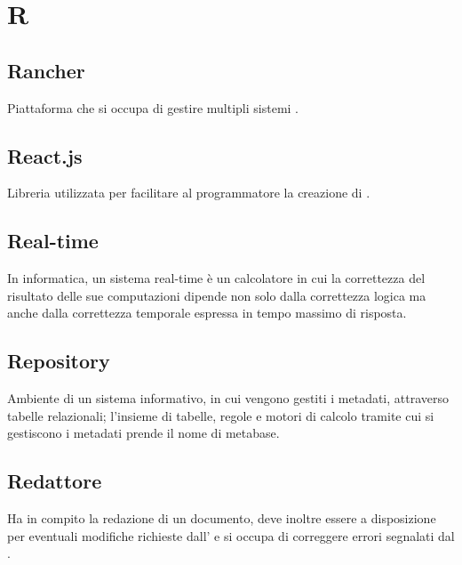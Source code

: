 \section*{R}
\markright{}

\subsection*{Rancher}
Piattaforma che si occupa di gestire multipli sistemi .

\subsection*{React.js}
Libreria  utilizzata per facilitare al programmatore la creazione di .

\subsection*{Real-time}
In informatica, un sistema real-time è un calcolatore in cui la correttezza del risultato delle sue computazioni dipende non solo dalla correttezza logica ma anche dalla correttezza temporale espressa in tempo massimo di risposta.

\subsection*{Repository}
Ambiente di un sistema informativo, in cui vengono gestiti i metadati, attraverso tabelle relazionali; l'insieme di tabelle, regole e motori di calcolo tramite cui si gestiscono i metadati prende il nome di metabase.  

\subsection*{Redattore}
Ha in compito la redazione di un documento, deve inoltre essere a disposizione per eventuali modifiche richieste dall' e si occupa di correggere errori segnalati dal .
